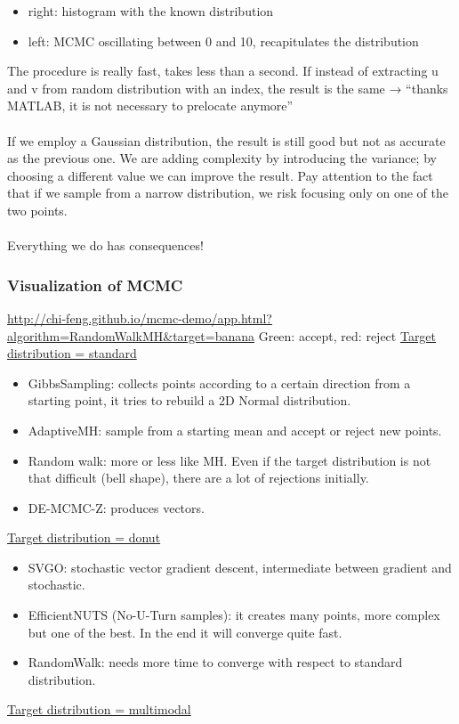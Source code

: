 \begin{itemize}
\tightlist
\item
  right: histogram with the known distribution
\item
  left: MCMC oscillating between 0 and 10, recapitulates the
  distribution
\end{itemize}
\noindent
The procedure is really fast, takes less than a second. If instead of
extracting u and v from random distribution with an index, the result is
the same → ``thanks MATLAB, it is not necessary to prelocate anymore''
\\
\\
\noindent
If we employ a Gaussian distribution, the result is still good but not
as accurate as the previous one. We are adding complexity by introducing
the variance; by choosing a different value we can improve the result.
Pay attention to the fact that if we sample from a narrow distribution,
we risk focusing only on one of the two points.
\\
\\
\noindent
Everything we do has consequences!


\subsubsection{Visualization of MCMC}

\url{http://chi-feng.github.io/mcmc-demo/app.html?algorithm=RandomWalkMH\&target=banana}
\noindent
Green: accept, red: reject
\noindent
\underline{Target distribution = standard}

\begin{itemize}
\tightlist
\item
  GibbsSampling: collects points according to a certain direction from a
  starting point, it tries to rebuild a 2D Normal distribution.
\item
  AdaptiveMH: sample from a starting mean and accept or reject new
  points.
\item
  Random walk: more or less like MH. Even if the target distribution is
  not that difficult (bell shape), there are a lot of rejections
  initially.
\item
  DE-MCMC-Z: produces vectors.
\end{itemize}
\noindent
\underline{Target distribution = donut}

\begin{itemize}
\tightlist
\item
  SVGO: stochastic vector gradient descent, intermediate between
  gradient and stochastic.
\item
  EfficientNUTS (No-U-Turn samples): it creates many points, more
  complex but one of the best. In the end it will converge quite fast.
\item
  RandomWalk: needs more time to converge with respect to standard
  distribution.
\end{itemize}
\noindent
\underline{Target distribution = multimodal}

